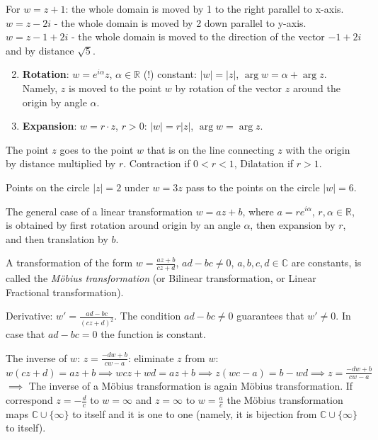 \documentclass[12pt]{article}
\begin{document}
\begin{example}
For $w = z+1$: the whole domain is moved by 1 to the right parallel to x-axis.
$w = z-2i$ - the whole domain is moved by 2 down parallel to y-axis.
$w = z-1+2i$ - the whole domain is moved to the direction of the vector $-1+2i$ and by distance $\sqrt{5}$.
\end{example}

\begin{enumerate}
    \setcounter{enumi}{1}
    \item \textbf{Rotation}: $w = e^{i\alpha}z$, $\alpha \in \mathbb{R}$ (!) constant: $|w| = |z|$, $\arg w = \alpha + \arg z$. Namely, $z$ is moved to the point $w$ by rotation of the vector $z$ around the origin by angle $\alpha$.
    \item \textbf{Expansion}: $w = r \cdot z$, $r > 0$: $|w| = r|z|$, $\arg w = \arg z$.
\end{enumerate}
The point $z$ goes to the point $w$ that is on the line connecting $z$ with the origin by distance multiplied by $r$.
Contraction if $0 < r < 1$, Dilatation if $r > 1$.

\begin{example}
Points on the circle $|z| = 2$ under $w = 3z$ pass to the points on the circle $|w| = 6$.
\end{example}

The general case of a linear transformation $w = az + b$, where $a = re^{i\alpha}$, $r, \alpha \in \mathbb{R}$, is obtained by first rotation around origin by an angle $\alpha$, then expansion by $r$, and then translation by $b$.

\begin{definition}
A transformation of the form $w = \frac{az+b}{cz+d}$, $ad-bc \neq 0$, $a,b,c,d \in \mathbb{C}$ are constants, is called the \emph{Möbius transformation} (or Bilinear transformation, or Linear Fractional transformation).
\end{definition}

Derivative: $w' = \frac{ad-bc}{(cz+d)^2}$. The condition $ad-bc \neq 0$ guarantees that $w' \neq 0$. In case that $ad-bc = 0$ the function is constant.

The inverse of $w$: $z = \frac{-dw+b}{cw-a}$: eliminate $z$ from $w$:
$w(cz+d) = az+b \implies wcz + wd = az+b \implies z(wc-a) = b-wd \implies z = \frac{-dw+b}{cw-a}$
$\implies$ The inverse of a Möbius transformation is again Möbius transformation. If correspond $z = -\frac{d}{c}$ to $w = \infty$ and $z = \infty$ to $w = \frac{a}{c}$ the Möbius transformation maps $\mathbb{C} \cup \{\infty\}$ to itself and it is one to one (namely, it is bijection from $\mathbb{C} \cup \{\infty\}$ to itself).
\end{document}
